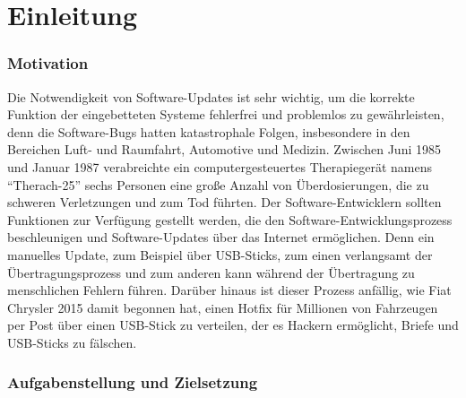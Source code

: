 \chapter{Einleitung}

\subsection{Motivation}

Die Notwendigkeit von Software-Updates ist sehr wichtig, um die korrekte Funktion
der eingebetteten Systeme fehlerfrei und problemlos zu gewährleisten, denn die Software-Bugs hatten katastrophale Folgen, insbesondere in den Bereichen Luft- und Raumfahrt, Automotive und Medizin. Zwischen Juni 1985 und Januar 1987 verabreichte ein computergesteuertes Therapiegerät namens “Therach-25” sechs Personen eine große Anzahl von Überdosierungen, die zu schweren Verletzungen und zum Tod führten.
Der Software-Entwicklern sollten Funktionen zur Verfügung gestellt werden, die den Software-Entwicklungsprozess beschleunigen und Software-Updates über das Internet ermöglichen. Denn ein manuelles Update, zum Beispiel über USB-Sticks, zum einen verlangsamt der Übertragungsprozess und zum anderen kann während der Übertragung zu menschlichen Fehlern führen. Darüber hinaus ist dieser Prozess anfällig, wie Fiat Chrysler 2015 damit begonnen hat, einen Hotfix für Millionen von Fahrzeugen per Post über einen USB-Stick zu verteilen, der es Hackern ermöglicht, Briefe und USB-Sticks zu fälschen.


\subsection{Aufgabenstellung und Zielsetzung}
